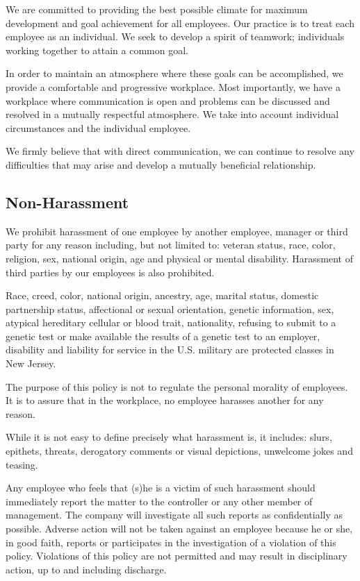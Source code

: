 \documentclass{book}
\begin{document}
We are committed to providing the best possible climate for maximum development and goal achievement for all employees. Our practice is to treat each employee as an individual. We seek to develop a spirit of teamwork; individuals working together to attain a common goal.

In order to maintain an atmosphere where these goals can be accomplished, we provide a comfortable and progressive workplace. Most importantly, we have a workplace where communication is open and problems can be discussed and resolved in a mutually respectful atmosphere. We take into account individual circumstances and the individual employee.

We firmly believe that with direct communication, we can continue to resolve any difficulties that may arise and develop a mutually beneficial relationship.

\subsection{Non-Harassment}

We prohibit harassment of one employee by another employee, manager or third party for any reason including, but not limited to: veteran status, race, color, religion, sex, national origin, age and physical or mental disability. Harassment of third parties by our employees is also prohibited.

Race, creed, color, national origin, ancestry, age, marital status, domestic partnership status, affectional or sexual orientation, genetic information, sex, atypical hereditary cellular or blood trait, nationality, refusing to submit to a genetic test or make available the results of a genetic test to an employer, disability and liability for service in the U.S. military are protected classes in New Jersey.

The purpose of this policy is not to regulate the personal morality of employees. It is to assure that in the workplace, no employee harasses another for any reason.

While it is not easy to define precisely what harassment is, it includes: slurs, epithets, threats, derogatory comments or visual depictions, unwelcome jokes and teasing.

Any employee who feels that (s)he is a victim of such harassment should immediately report the matter to the controller or any other member of management. The company will investigate all such reports as confidentially as possible. Adverse action will not be taken against an employee because he or she, in good faith, reports or participates in the investigation of a violation of this policy. Violations of this policy are not permitted and may result in disciplinary action, up to and including discharge.
\end{document}
